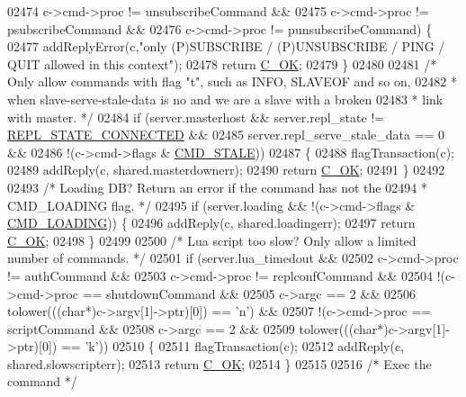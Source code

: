 \begin{DoxyCode}
{{{{{{{{{{{{{{{{{{{{{{{{{{{{{{{{02474         c->cmd->proc != unsubscribeCommand &&
02475         c->cmd->proc != psubscribeCommand &&
02476         c->cmd->proc != punsubscribeCommand) \{
02477         addReplyError(c,\textcolor{stringliteral}{"only (P)SUBSCRIBE / (P)UNSUBSCRIBE / PING / QUIT allowed in this context"});
02478         \textcolor{keywordflow}{return} \hyperlink{server_8h_a303769ef1065076e68731584e758d3e1}{C\_OK};
02479     \}
02480 
02481     \textcolor{comment}{/* Only allow commands with flag "t", such as INFO, SLAVEOF and so on,}
02482 \textcolor{comment}{     * when slave-serve-stale-data is no and we are a slave with a broken}
02483 \textcolor{comment}{     * link with master. */}
02484     \textcolor{keywordflow}{if} (server.masterhost && server.repl\_state != \hyperlink{server_8h_aed693b3a9cdfc05cf5ab7551a8c86fbe}{REPL\_STATE\_CONNECTED} &&
02485         server.repl\_serve\_stale\_data == 0 &&
02486         !(c->cmd->flags & \hyperlink{server_8h_acf1f58ff0b6790cd8d0e3edf1a7e599f}{CMD\_STALE}))
02487     \{
02488         flagTransaction(c);
02489         addReply(c, shared.masterdownerr);
02490         \textcolor{keywordflow}{return} \hyperlink{server_8h_a303769ef1065076e68731584e758d3e1}{C\_OK};
02491     \}
02492 
02493     \textcolor{comment}{/* Loading DB? Return an error if the command has not the}
02494 \textcolor{comment}{     * CMD\_LOADING flag. */}
02495     \textcolor{keywordflow}{if} (server.loading && !(c->cmd->flags & \hyperlink{server_8h_a5327d118cf467e77d8bb0cebdce3c0ce}{CMD\_LOADING})) \{
02496         addReply(c, shared.loadingerr);
02497         \textcolor{keywordflow}{return} \hyperlink{server_8h_a303769ef1065076e68731584e758d3e1}{C\_OK};
02498     \}
02499 
02500     \textcolor{comment}{/* Lua script too slow? Only allow a limited number of commands. */}
02501     \textcolor{keywordflow}{if} (server.lua\_timedout &&
02502           c->cmd->proc != authCommand &&
02503           c->cmd->proc != replconfCommand &&
02504         !(c->cmd->proc == shutdownCommand &&
02505           c->argc == 2 &&
02506           tolower(((\textcolor{keywordtype}{char}*)c->argv[1]->ptr)[0]) == \textcolor{stringliteral}{'n'}) &&
02507         !(c->cmd->proc == scriptCommand &&
02508           c->argc == 2 &&
02509           tolower(((\textcolor{keywordtype}{char}*)c->argv[1]->ptr)[0]) == \textcolor{stringliteral}{'k'}))
02510     \{
02511         flagTransaction(c);
02512         addReply(c, shared.slowscripterr);
02513         \textcolor{keywordflow}{return} \hyperlink{server_8h_a303769ef1065076e68731584e758d3e1}{C\_OK};
02514     \}
02515 
02516     \textcolor{comment}{/* Exec the command */}
}}}}}}}}}}}}}}}}}}}}}}}}}}}}}}}}
\end{DoxyCode}
